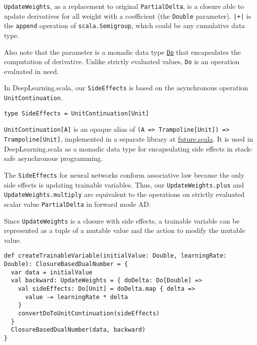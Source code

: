 \lstinline{UpdateWeights}, as a replacement to original \lstinline{PartialDelta}, is a closure able to update derivatives for all weight with a coefficient (the \lstinline{Double} parameter).
\lstinline{|+|} is the \lstinline{append} operation of \lstinline{scala.Semigroup}, which could be any cumulative data type.

Also note that the parameter is a monadic data type \href{https://javadoc.io/page/com.thoughtworks.raii/asynchronous_2.11/latest/com/thoughtworks/raii/asynchronous%24%24Do.html}{\lstinline{Do}} that encapsulates the computation of derivative. Unlike strictly evaluated values, \lstinline{Do} is an operation evaluated in need.

In DeepLearning.scala, our \lstinline{SideEffects} is based on the asynchronous operation \lstinline{UnitContinuation}.

\begin{lstlisting}[float={h t b p},caption={Monadic side-effects}, label={SideEffects}]
type SideEffects = UnitContinuation[Unit]
\end{lstlisting}

\lstinline{UnitContinuation[A]} is an opaque alias \cite{erik2017opaque} of \lstinline{(A => Trampoline[Unit]) => Trampoline[Unit]}, implemented in a separate library at \href{https://github.com/ThoughtWorksInc/future.scala}{future.scala}. It is used in DeepLearning.scala as a monadic data type for encapsulating side effects in stack-safe asynchronous programming.

The \lstinline{SideEffects} for neural networks conform associative law because the only side effects is updating \glspl{trainable variable}. Thus, our \lstinline{UpdateWeights.plus} and \lstinline{UpdateWeights.multiply} are equivalent to the operations on strictly evaluated scalar value \lstinline{PartialDelta} in forward mode AD.

Since \lstinline{UpdateWeights} is a closure with side effects, a \gls{trainable variable} can be represented as a tuple of a mutable value and the action to modify the mutable value.

\begin{lstlisting}[float={h t b p},caption={Create a dual number for a \gls{trainable variable}}, label={createTrainableVariable}]
def createTrainableVariable(initialValue: Double, learningRate: Double): ClosureBasedDualNumber = {
  var data = initialValue
  val backward: UpdateWeights = { doDelta: Do[Double] =>
    val sideEffects: Do[Unit] = doDelta.map { delta =>
      value -= learningRate * delta
    }
    convertDoToUnitContinuation(sideEffects)
  }
  ClosureBasedDualNumber(data, backward)
}
\end{lstlisting}

